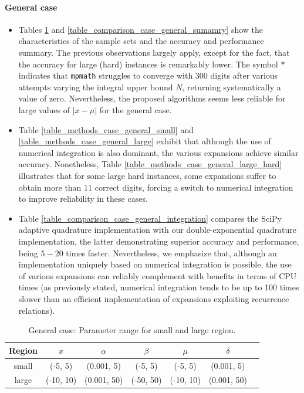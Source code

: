 \documentclass[10pt,a4paper,oneside]{article}
\numberwithin{equation}{section}
\begin{document}
\paragraph{General case}
\begin{itemize}
\item Tables \ref{table_parameters_case_general} and \ref{table_comparison_case_general_sumamry} show the characteristics of the sample sets and the accuracy and performance summary. The previous observations largely apply, except for the fact, that the accuracy for large (hard) instances is remarkably lower. The symbol $*$ indicates that \texttt{mpmath} struggles to converge with 300 digits after various attempts varying the integral upper bound $N$, returning systematically a value of zero. Nevertheless, the proposed algorithms seems less reliable for large values of $|x-\mu|$ for the general case.
\item Table \ref{table_methods_case_general_small} and  \ref{table_methods_case_general_large} exhibit that although the use of numerical integration is also dominant, the various expansions achieve similar accuracy. Nonetheless, Table \ref{table_methods_case_general_large_hard} illustrates that for some large hard instances, some expansions suffer to obtain more than 11 correct digits, forcing a switch to numerical integration to improve reliability in these cases.
\item Table \ref{table_comparison_case_general_integration} compares the SciPy adaptive quadrature implementation with our double-exponential quadrature implementation, the latter demonstrating superior accuracy and performance, being $5-20$ times faster. Nevertheless, we emphasize that, although an implementation uniquely based on numerical integration is possible, the use of various expansions can reliably complement with benefits in terms of CPU times (as previously stated, numerical integration tends to be up to 100 times slower than an efficient implementation of expansions exploiting recurrence relations).
\end{itemize}

\begin{table}[htbp]
\centering
\scalebox{0.9}
{
	\begin{tabular}{c|cccccc}
	\hline
	Region & $x$ & $\alpha$ & $\beta$ & $\mu$ & $\delta$\\
	\hline	
	small & (-5, 5) & (0.001, 5) & (-5, 5) & (-5, 5) & (0.001, 5)\\
	large & (-10, 10) & (0.001, 50) & (-50, 50) & (-10, 10) & (0.001, 50)\\
	\hline
	\end{tabular}
}
\caption{General case: Parameter range for small and large region.}
	\label{table_parameters_case_general}
\end{table}
\end{document}
